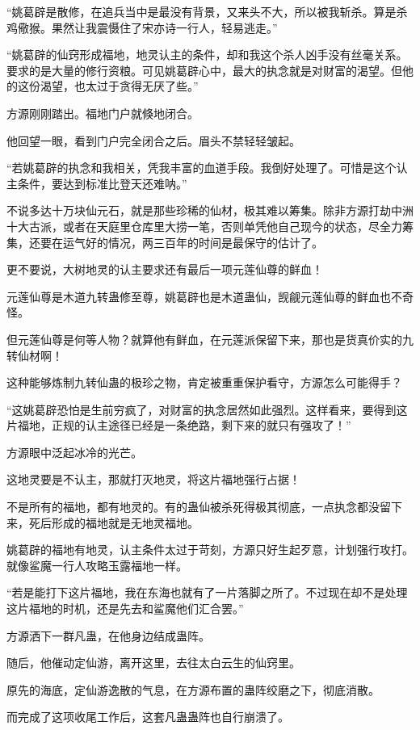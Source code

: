 \begin{this_body}
“姚葛辟是散修，在追兵当中是最没有背景，又来头不大，所以被我斩杀。算是杀鸡儆猴。果然让我震慑住了宋亦诗一行人，轻易逃走。”

“姚葛辟的仙窍形成福地，地灵认主的条件，却和我这个杀人凶手没有丝毫关系。要求的是大量的修行资粮。可见姚葛辟心中，最大的执念就是对财富的渴望。但他的这份渴望，也太过于贪得无厌了些。”

方源刚刚踏出。福地门户就倏地闭合。

他回望一眼，看到门户完全闭合之后。眉头不禁轻轻皱起。

“若姚葛辟的执念和我相关，凭我丰富的血道手段。我倒好处理了。可惜是这个认主条件，要达到标准比登天还难呐。”

不说多达十万块仙元石，就是那些珍稀的仙材，极其难以筹集。除非方源打劫中洲十大古派，或者在天庭里仓库里大捞一笔，否则单凭他自己现今的状态，尽全力筹集，还要在运气好的情况，两三百年的时间是最保守的估计了。

更不要说，大树地灵的认主要求还有最后一项元莲仙尊的鲜血！

元莲仙尊是木道九转蛊修至尊，姚葛辟也是木道蛊仙，觊觎元莲仙尊的鲜血也不奇怪。

但元莲仙尊是何等人物？就算他有鲜血，在元莲派保留下来，那也是货真价实的九转仙材啊！

这种能够炼制九转仙蛊的极珍之物，肯定被重重保护看守，方源怎么可能得手？

“这姚葛辟恐怕是生前穷疯了，对财富的执念居然如此强烈。这样看来，要得到这片福地，正规的认主途径已经是一条绝路，剩下来的就只有强攻了！”

方源眼中泛起冰冷的光芒。

这地灵要是不认主，那就打灭地灵，将这片福地强行占据！

不是所有的福地，都有地灵的。有的蛊仙被杀死得极其彻底，一点执念都没留下来，死后形成的福地就是无地灵福地。

姚葛辟的福地有地灵，认主条件太过于苛刻，方源只好生起歹意，计划强行攻打。就像鲨魔一行人攻略玉露福地一样。

“若是能打下这片福地，我在东海也就有了一片落脚之所了。不过现在却不是处理这片福地的时机，还是先去和鲨魔他们汇合罢。”

方源洒下一群凡蛊，在他身边结成蛊阵。

随后，他催动定仙游，离开这里，去往太白云生的仙窍里。

原先的海底，定仙游逸散的气息，在方源布置的蛊阵绞磨之下，彻底消散。

而完成了这项收尾工作后，这套凡蛊蛊阵也自行崩溃了。


\end{this_body}
